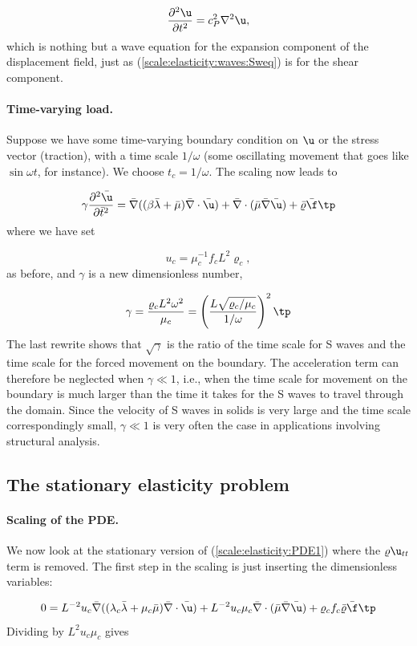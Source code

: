 \documentclass[graybox,envcountchap,sectrefs,final]{svmonodo}
\begin{document}
\[ \frac{\partial^2\u}{\partial t^2} = c_P^2\nabla^2\u,\]
\label{scale:elasticity:waves:Pweq}
which is nothing but a wave equation for the expansion component of the
displacement field, just as (\ref{scale:elasticity:waves:Sweq}) is for the
shear component.


\paragraph{Time-varying load.}
Suppose we have some time-varying boundary condition on $\u$ or the
stress vector (traction), with a time scale $1/\omega$ (some
oscillating movement that goes like $\sin\omega t$, for instance). We
choose $t_c=1/\omega$.  The scaling now leads to

\[
\gamma
\frac{\partial^2\bar \u}{\partial \bar t^2} =
\bar \nabla ((\beta\bar\lambda +
\bar\mu)\bar \nabla\cdot\bar \u) +
\bar \nabla\cdot(\bar \mu\bar \nabla\bar \u) +
\bar\varrho\bar\f\tp
\]
where we have set

\[ u_c = \mu_c^{-1}f_cL^2\varrho_c,\]
as before, and $\gamma$ is a new dimensionless number,

\[ \gamma = \frac{\varrho_cL^2 \omega^2}{\mu_c} =
\left(\frac{L\sqrt{\varrho_c/\mu_c}}{1/\omega}\right)^2\tp\]
The last rewrite shows that $\sqrt{\gamma}$ is the ratio of
the time scale for S waves and the time scale for the forced
movement on the boundary. The acceleration term can therefore
be neglected when $\gamma\ll 1$, i.e., when the time scale
for movement on the boundary is much larger than the time it
takes for the S waves to travel through the domain.
Since the velocity of S waves in solids is very large and
the time scale correspondingly small, $\gamma\ll 1$
is very often the case in applications involving structural analysis.


\subsection{The stationary elasticity problem}
\label{scale:elasticity:stationary}

\paragraph{Scaling of the PDE.}
We now look at the stationary version of (\ref{scale:elasticity:PDE1})
where the $\varrho\u_{tt}$ term is removed. The first step in the
scaling is just inserting the dimensionless variables:

\[
0 =
L^{-2}u_c\bar \nabla ((\lambda_c\bar\lambda +
\mu_c\bar\mu)\bar \nabla\cdot\bar \u) +
L^{-2}u_c\mu_c\bar \nabla\cdot(\bar \mu\bar \nabla\bar \u) +
\varrho_cf_c\bar\varrho\bar\f\tp
\]
Dividing by $L^2u_c\mu_c$ gives
\end{document}
